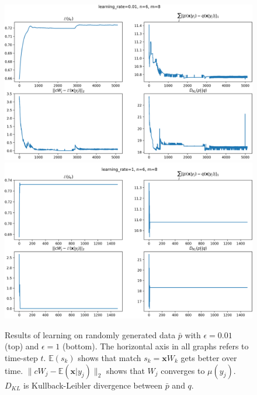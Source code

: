 \documentclass[12pt]{article}
\begin{document}
\begin{figure}[!htbp]
	\centering
	\includegraphics[width=13.5cm]{k_means_convergence}
	\includegraphics[width=13.5cm]{k_means_convergence2}
	\caption{Results of learning on randomly generated data $\bar{p}$ with $\epsilon=0.01$ (top) and $\epsilon=1$ (bottom). The horizontal axis in all graphs refers to time-step $t$. $\mathbb{E}(s_k)$ shows that match $s_k=\boldsymbol{x}W_k$ gets better over time. $\lVert c W_j - \mathbb{E}(\boldsymbol{x}|y_j)\rVert_2$ shows that $W_j$ converges to $\mu(y_j)$. $D_{KL}$ is Kullback-Leibler divergence between $\bar{p}$ and $q$.}
	\label{fig:k_means}
\end{figure} 
\end{document}

